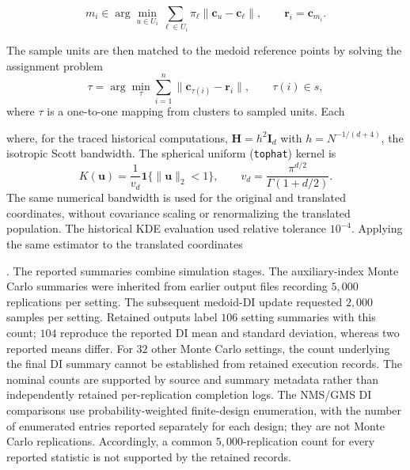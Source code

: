 
\[
m_i
\in
\arg\min_{u\in U_i}
\sum_{\ell\in U_i}\pi_\ell
\|\bm c_u-\bm c_\ell\|,
\qquad
\bm r_i=\bm c_{m_i}.
\]

 The sample units are then matched to the medoid reference points by solving the
assignment problem
\[
\tau
=
\arg\min_{\tau}
\sum_{i=1}^n
\|\bm c_{\tau(i)}-\bm r_i\|,
\qquad
\tau(i)\in s,
\]
where \(\tau\) is a one-to-one mapping from clusters to sampled units. Each

where, for the traced historical computations,
\(\mathbf H=h^2\mathbf I_d\) with \(h=N^{-1/(d+4)}\), the isotropic
Scott bandwidth. The spherical uniform (\texttt{tophat}) kernel is
\[
K(\bm u)=\frac{1}{v_d}\mathbf 1\{\|\bm u\|_2<1\},
\qquad v_d=\frac{\pi^{d/2}}{\Gamma(1+d/2)}.
\]
The same numerical bandwidth is used for the original and translated
coordinates, without covariance scaling or renormalizing the translated
population. The historical KDE evaluation used relative tolerance
\(10^{-4}\). Applying the same estimator to the translated coordinates

\citep{sampling_pkg}. The reported summaries combine simulation stages.
The auxiliary-index Monte Carlo summaries were inherited from earlier
output files recording \(5{,}000\) replications per setting. The subsequent
medoid-DI update requested \(2{,}000\) samples per setting. Retained outputs
label \(106\) setting summaries with this count; \(104\) reproduce the
reported DI mean and standard deviation, whereas two reported means differ.
For \(32\) other Monte Carlo settings, the count underlying the final DI
summary cannot be established from retained execution records. The nominal
counts are supported by source and summary metadata rather than independently
retained per-replication completion logs. The NMS/GMS DI comparisons use
probability-weighted finite-design enumeration, with the number of enumerated
entries reported separately for each design; they are not Monte Carlo
replications. Accordingly, a common \(5{,}000\)-replication count for every
reported statistic is not supported by the retained records.

